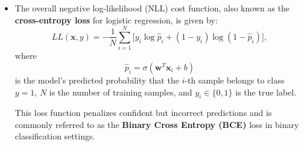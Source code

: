 \documentclass{article}
\newcommand{\keyintuition}[1]{%
\begin{intuitionbox}
\noindent\textbf{Key intuition.} #1
\end{intuitionbox}
}
\begin{document}
\begin{itemize}
    \[
      y =
      \begin{cases}
        1     & P(y = 1|x) > 0.5, \\
        0 & \textit{otherwise}.
      \end{cases}
    \]
    This is an example of a simple classification rule based on simple data grouped at $y = 0$ and $y = 1$. In this case, thresholding at 0.5 corresponds to the hyperplane $\mathbf{w}^T\mathbf{x} + b = 0$.
        \keyintuition{
    Logistic regression is a \emph{linear classifier} in feature space: it predicts using the sign of
    $\mathbf{w}^T\mathbf{x}+b$ and then converts that score into a probability using the sigmoid.
    The value $\mathbf{w}^T\mathbf{x}+b$ is a \emph{signed distance-like score}: it increases when $\mathbf{x}$
    moves in the direction of $\mathbf{w}$, and decreases when moving opposite to $\mathbf{w}$.
    Feature normalization matters because rescaling one feature changes how much it contributes to this score.
    }

    \item The overall negative log-likelihood (NLL) cost function, also known as the \textbf{cross-entropy loss} for logistic regression, is given by:
    \[
    LL(\mathbf{x}, y)
    = -\frac{1}{N}\sum_{i=1}^{N}
    \Big[
    y_i \log \hat{p}_i
    + (1-y_i)\log(1-\hat{p}_i)
    \Big],
    \]
    where
    \[
    \hat{p}_i = \sigma(\mathbf{w}^T\mathbf{x}_i + b)
    \]
    is the model’s predicted probability that the $i$-th sample belongs to class $y=1$,
    $N$ is the number of training samples, and $y_i\in\{0,1\}$ is the true label.
    
    This loss function penalizes confident but incorrect predictions and is commonly referred to as the \textbf{Binary Cross Entropy (BCE)} loss in binary classification settings.


\end{itemize}
\end{document}
